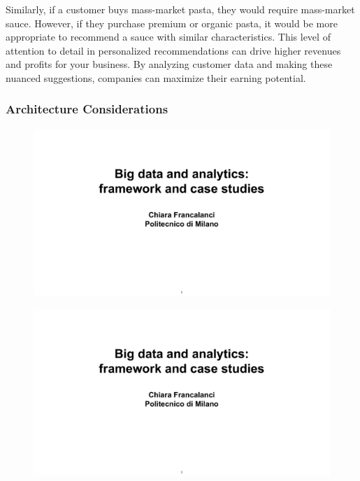 Similarly, if a customer buys mass-market pasta, they would require
mass-market sauce. However, if they purchase premium or organic pasta,
it would be more appropriate to recommend a sauce with similar
characteristics. This level of attention to detail in personalized
recommendations can drive higher revenues and profits for your business.
By analyzing customer data and making these nuanced suggestions,
companies can maximize their earning potential.

\subsubsection{Architecture Considerations}

\begin{figure}[!h]
  \centering
  \includegraphics[page=97, trim = 0cm 2cm 0cm 4.5cm, clip, width=\imagewidth]{images/06 - BIG_DATA.pdf}
\end{figure}

\begin{figure}[!h]
  \centering
  \includegraphics[page=98, trim = 0cm 9cm 1.5cm 4.8cm, clip, width=\imagewidth]{images/06 - BIG_DATA.pdf}
\end{figure}

